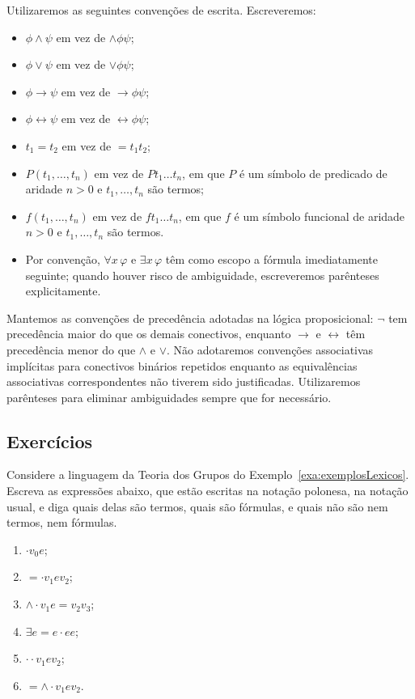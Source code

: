 \begin{convention}\label{conv:convencoesEscritaPrimeiraOrdem}Utilizaremos as seguintes convenções de escrita.
    Escreveremos:
\begin{itemize}
    \item $\phi \wedge \psi$ em vez de ${\wedge}\phi\psi$;
    \item $\phi \vee \psi$ em vez de ${\vee}\phi\psi$;
    \item $\phi \rightarrow \psi$ em vez de ${\rightarrow}\phi\psi$;
    \item $\phi \leftrightarrow \psi$ em vez de ${\leftrightarrow}\phi\psi$;
    \item $t_1 = t_2$ em vez de ${=}t_1 t_2$;
    \item $P(t_1, \dots, t_n)$ em vez de $P t_1 \dots t_n$, em que $P$ é um símbolo de predicado de aridade $n>0$ e $t_1, \dots, t_n$ são termos;
    \item $f(t_1, \dots, t_n)$ em vez de $f t_1 \dots t_n$, em que $f$ é um símbolo funcional de aridade $n>0$ e $t_1, \dots, t_n$ são termos.
    \item Por convenção, $\forall x\,\varphi$ e $\exists x\,\varphi$ têm como escopo a fórmula imediatamente seguinte; quando houver risco de ambiguidade, escreveremos parênteses explicitamente.
\end{itemize}
Mantemos as convenções de precedência adotadas na lógica proposicional: $\neg$ tem precedência maior do que os demais conectivos, enquanto $\rightarrow$ e $\leftrightarrow$ têm precedência menor do que $\wedge$ e $\vee$. 
Não adotaremos convenções associativas implícitas para conectivos binários repetidos enquanto as equivalências associativas correspondentes não tiverem sido justificadas. 
Utilizaremos parênteses para eliminar ambiguidades sempre que for necessário.
\end{convention}

\subsection*{Exercícios}

\begin{exercise}\label{exr:gruposNotacaoPolonesa}
    Considere a linguagem da Teoria dos Grupos do Exemplo~\ref{exa:exemplosLexicos}.
    Escreva as expressões abaixo, que estão escritas na notação polonesa, na notação usual, e diga quais delas são termos, quais são fórmulas, e quais não são nem termos, nem fórmulas.

    \begin{enumerate}[label=(\roman*)]
        \item $\cdot v_0 e$;
        \item ${=} {\cdot} v_1 e v_2$;
        \item ${\wedge} {\cdot} v_1 e {=} v_2 v_3$;
        \item $\exists e {=} e {\cdot} e e$;
        \item $\cdot \cdot v_1 e v_2$;
        \item ${=} {\wedge} {\cdot} v_1 e v_2$.
    \end{enumerate}
\end{exercise}

